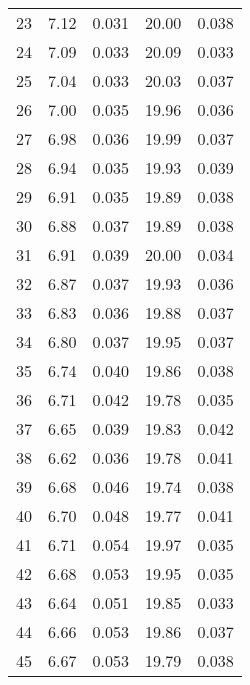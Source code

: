 \begin{table}
\begin{tabular}{c|ll|ll}
23 & 7.12 & 0.031 & 20.00 & 0.038 \\
24 & 7.09 & 0.033 & 20.09 & 0.033 \\
25 & 7.04 & 0.033 & 20.03 & 0.037 \\
26 & 7.00 & 0.035 & 19.96 & 0.036 \\
27 & 6.98 & 0.036 & 19.99 & 0.037 \\
28 & 6.94 & 0.035 & 19.93 & 0.039 \\
29 & 6.91 & 0.035 & 19.89 & 0.038 \\
30 & 6.88 & 0.037 & 19.89 & 0.038 \\
31 & 6.91 & 0.039 & 20.00 & 0.034 \\
32 & 6.87 & 0.037 & 19.93 & 0.036 \\
33 & 6.83 & 0.036 & 19.88 & 0.037 \\
34 & 6.80 & 0.037 & 19.95 & 0.037 \\
35 & 6.74 & 0.040 & 19.86 & 0.038 \\
36 & 6.71 & 0.042 & 19.78 & 0.035 \\
37 & 6.65 & 0.039 & 19.83 & 0.042 \\
38 & 6.62 & 0.036 & 19.78 & 0.041 \\
39 & 6.68 & 0.046 & 19.74 & 0.038 \\
40 & 6.70 & 0.048 & 19.77 & 0.041 \\
41 & 6.71 & 0.054 & 19.97 & 0.035 \\
42 & 6.68 & 0.053 & 19.95 & 0.035 \\
43 & 6.64 & 0.051 & 19.85 & 0.033 \\
44 & 6.66 & 0.053 & 19.86 & 0.037 \\
45 & 6.67 & 0.053 & 19.79 & 0.038 \\
               \hline
        \end{tabular}
    \end{table}
    \clearpage

